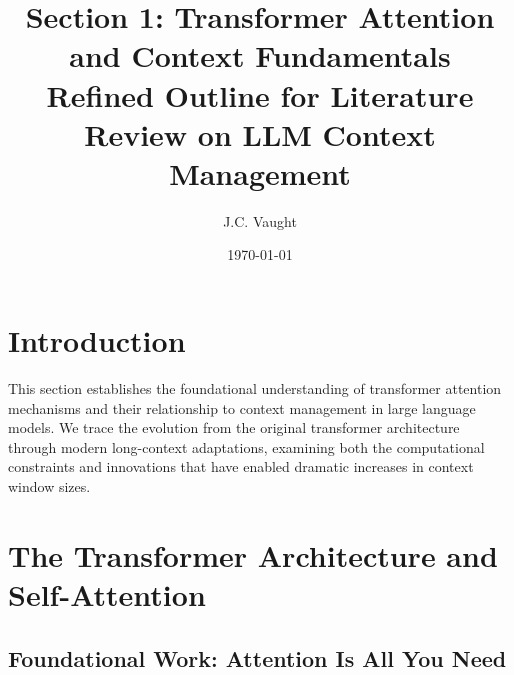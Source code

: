 \documentclass[11pt,letterpaper]{article}
\title{\textbf{\color{garnet}Section 1: Transformer Attention and Context Fundamentals}\\
\large Refined Outline for Literature Review on LLM Context Management}
\author{J.C. Vaught}
\date{\today}
\begin{document}
\maketitle

\section{Introduction}

This section establishes the foundational understanding of transformer attention mechanisms and their relationship to context management in large language models. We trace the evolution from the original transformer architecture through modern long-context adaptations, examining both the computational constraints and innovations that have enabled dramatic increases in context window sizes.

\section{The Transformer Architecture and Self-Attention}

\subsection{Foundational Work: Attention Is All You Need}
\end{document}
